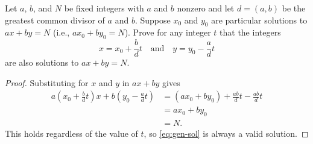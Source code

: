  Let $a$, $b$, and $N$ be fixed integers with $a$ and $b$
nonzero and let $d = (a, b)$ be the greatest common divisor of $a$ and
$b$. Suppose $x_0$ and $y_0$ are particular solutions to $ax + by = N$
(i.e., $ax_0 + by_0 = N$). Prove for any integer $t$ that the integers
\begin{equation}
  \label{eq:gen-sol}
  x = x_0 + \frac{b}{d}t \quad\text{and}\quad y = y_0 - \frac{a}{d}t
\end{equation}
are also solutions to $ax + by = N$.
\begin{proof}
  Substituting for $x$ and $y$ in $ax + by$ gives
  \begin{align*}
    a\left(x_0 + \frac{b}{d}t\right)x + b\left(y_0 - \frac{a}{d}t\right)
    &= (ax_0 + by_0) + \frac{ab}{d}t - \frac{ab}{d}t \\
    &= ax_0 + by_0 \\
    &= N.
  \end{align*}
  This holds regardless of the value of $t$, so \eqref{eq:gen-sol} is
  always a valid solution.
\end{proof}

